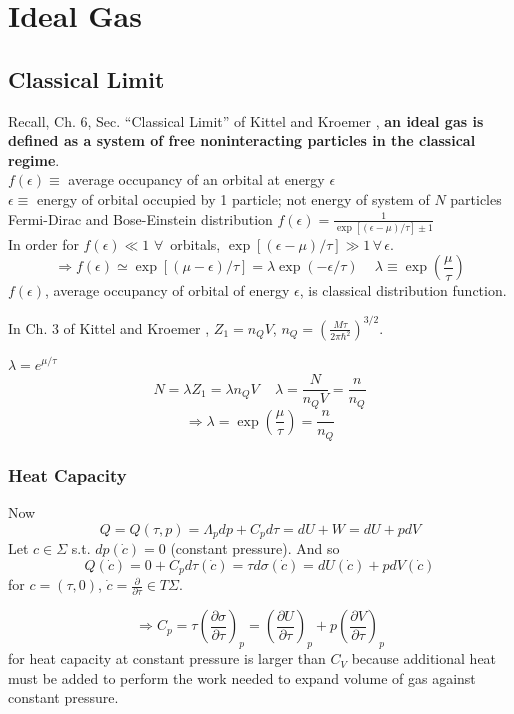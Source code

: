 \documentclass[twoside]{amsart}
\theoremstyle{plain}
\theoremstyle{definition}
\begin{document}
\section{Ideal Gas}

\subsection*{Classical Limit}

Recall, Ch. 6, Sec. ``Classical Limit'' of Kittel and Kroemer \cite{CKittelHKroemer1980}, \textbf{an ideal gas is defined as a system of free noninteracting particles in the classical regime}.  \\
$f(\epsilon) \equiv $ average occupancy of an orbital at energy $\epsilon$ \\
$\epsilon \equiv $ energy of orbital occupied by 1 particle; not energy of system of $N$ particles \\
Fermi-Dirac and Bose-Einstein distribution $f(\epsilon) = \frac{1}{ \exp{ [ (\epsilon - \mu )/\tau ] } \pm 1 }$ \\
In order for $f(\epsilon) \ll 1$ $\forall \, $ orbitals, $\exp{ [ (\epsilon-\mu)/\tau ] } \gg 1\, \forall \, \epsilon$.  
\[
\Longrightarrow f(\epsilon) \simeq \exp{ [(\mu - \epsilon )/\tau]} = \lambda \exp{ (-\epsilon/\tau)} \quad \, \lambda \equiv \exp{ \left( \frac{ \mu }{\tau} \right) }
\]
$f(\epsilon)$, average occupancy of orbital of energy $\epsilon$, is classical distribution function.  

In Ch. 3 of Kittel and Kroemer \cite{CKittelHKroemer1980}, $Z_1 = n_Q V$, $n_Q = \left( \frac{M\tau}{ 2\pi \hbar^2} \right)^{3/2}$.

$\lambda = e^{\mu /\tau}$
\[
N=\lambda Z_1 = \lambda n_Q V \quad \,  \lambda = \frac{N}{n_Q V} = \frac{n}{n_Q}
\]
\[
\Longrightarrow \lambda = \exp{ \left( \frac{\mu}{\tau} \right)} = \frac{n}{n_Q}
\]

\subsubsection*{Heat Capacity}

Now 
\[
Q = Q(\tau,p) = \Lambda_p dp + C_p d\tau = dU + W = dU + p dV 
\]
Let $c\in \Sigma$ s.t. $dp(\dot{c})=0$ (constant pressure).  And so 
\[
Q(\dot{c}) = 0 + C_p d\tau(\dot{c}) = \tau d\sigma (\dot{c}) = dU(\dot{c}) + pdV(\dot{c})
\]
for $c=(\tau,0)$, $\dot{c} = \frac{\partial }{ \partial \tau} \in T\Sigma$.  

\[
\Longrightarrow C_p = \tau \left( \frac{ \partial \sigma }{ \partial \tau} \right)_p = \left( \frac{ \partial U}{ \partial \tau} \right)_p + p \left( \frac{ \partial V}{ \partial \tau} \right)_p
\]
for heat capacity at constant pressure is larger than $C_V$ because additional heat must be added to perform the work needed to expand volume of gas against constant pressure.  
\end{document}
